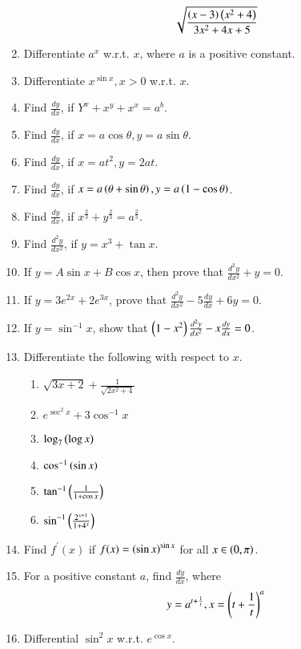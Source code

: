 \begin{enumerate}[label=\arabic*.,ref=\thesubsection.\theenumi]
%
\begin{align}
\sqrt{\frac{\left(x-3\right)\left(x^2+4\right)}{3x^2+4x+5}}
\end{align}
\item Differentiate $a^x$ w.r.t. $x$, where $a$ is a positive constant.
\item Differentiate $x^{\sin x}, x > 0$ w.r.t. $x$.
\item Find $\frac{dy}{dx}$, if $Y^x+x^y+x^x = a^b$.
\item Find $\frac{dy}{dx}$, if $x = a \cos \theta, y = a\sin \theta$.
\item Find $\frac{dy}{dx}$, if $x = a t^2, y = 2at$.
\item Find $\frac{dy}{dx}$, if $x = a \left(\theta+\sin \theta\right), y = a\left(1-\cos \theta\right)$.
\item Find $\frac{dy}{dx}$, if $x^{\frac{2}{3}}+y^{\frac{2}{3}} = a^{\frac{2}{3}}$.
\item Find $\frac{d^2y}{dx^2}$, if $y = x^3+\tan x$.
\item If $y = A \sin x + B \cos x$, then prove that  $\frac{d^2y}{dx^2} + y = 0$.
\item If $y = 3e^{2x}+2e^{3x}$, prove that $\frac{d^2y}{dx^2} - 5\frac{dy}{dx}+6y = 0$.
\item If $y = \sin ^{-1}x$, show that $\left(1-x^2\right)\frac{d^2y}{dx^2} - x\frac{dy}{dx} = 0$.
\item Differentiate the following with respect to $x$.
%
\begin{enumerate}
\item  $\sqrt{3x+2}+ \frac{1}{\sqrt{2x^2+4}}$
\item  $e^{\sec^2 x} + 3\cos^{-1} x$
\item $\log_7\left(\log x\right)$
\item $\cos ^{-1}\left(\sin x\right)$
\item $\tan ^{-1}\left(\frac{1}{1+\cos x}\right)$
\item $\sin^{-1}\left(\frac{2^{x+1}}{1+4^x}\right)$
\end{enumerate}
%
\item Find $f^{\prime}(x)$ if $f(x) = \left(\sin x\right)^{\sin x}$ for all $x \in \left(0, \pi\right)$.
\item For a positive constant $a$, find $\frac{dy}{dx}$, where 
%
\begin{align}
y = a^{t + \frac{1}{t}}, x = \left(t + \frac{1}{t}\right)^a
\end{align}
%
\item Differential $\sin ^2 x$ w.r.t. $e^{\cos x}$.
\end{enumerate}
